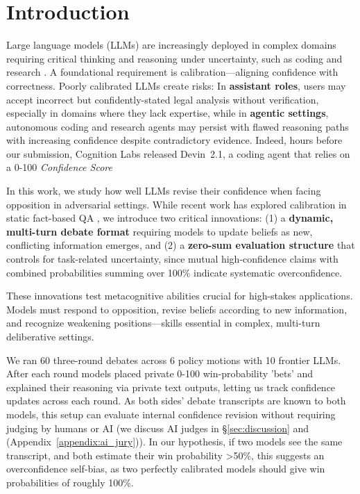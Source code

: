 \documentclass{article}
\begin{document}

\section{Introduction}

Large language models (LLMs) are increasingly deployed in complex domains requiring critical thinking and reasoning under uncertainty, such as coding and research \citep{handa2025economictasksperformedai, zheng2025deepresearcherscalingdeepresearch}. A foundational requirement is calibration—aligning confidence with correctness. Poorly calibrated LLMs create risks: In \textbf{assistant roles}, users may accept incorrect but confidently-stated legal analysis without verification, especially in domains where they lack expertise, while in \textbf{agentic settings}, autonomous coding and research agents may persist with flawed reasoning paths with increasing confidence despite contradictory evidence. Indeed, hours before our submission, Cognition Labs released Devin~2.1, a coding agent that relies on a 0-100 \emph{Confidence Score} \citep{cognitionlabs_devin21_2025}

In this work, we study how well LLMs revise their confidence when facing opposition in adversarial settings. While recent work has explored calibration in static fact-based QA \citep{tian2023justask, xiong2024uncertainty, kadavath2022know,groot-valdenegro-toro-2024-overconfidence}, we introduce two critical innovations:
(1) a \textbf{dynamic, multi-turn debate format} requiring models to update beliefs as new, conflicting information emerges, and
(2) a \textbf{zero-sum evaluation structure} that controls for task-related uncertainty, since mutual high-confidence claims with combined probabilities summing over 100\% indicate systematic overconfidence.

These innovations test metacognitive abilities crucial for high-stakes applications. Models must respond to opposition, revise beliefs according to new information, and recognize weakening positions—skills essential in complex, multi-turn deliberative settings.

We ran 60 three-round debates across 6 policy motions with 10 frontier LLMs. After each round models placed private 0-100 win-probability 'bets' and explained their reasoning via private text outputs, letting us track confidence updates across each round. As both sides' debate transcripts are known to both models, this setup can evaluate internal confidence revision without requiring judging by humans or AI (we discuss AI judges in \S\ref{sec:discussion} and (Appendix~\ref{appendix:ai_jury})). In our hypothesis, if two models see the same transcript, and both estimate their win probability >50\%, this suggests an overconfidence self-bias, as two perfectly calibrated models should give win probabilities of roughly 100\%.
\end{document}
